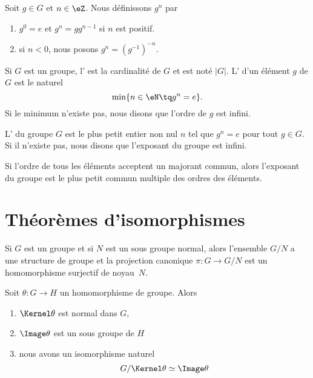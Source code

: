 \begin{definition}
    Soit \( g\in G\) et \( n\in \eZ\). Nous définissons \( g^n\) par
    \begin{enumerate}
        \item
            \( g^0=e\) et \( g^n=gg^{n-1}\) si \( n\) est positif.
        \item
            si \( n<0\), nous posons \( g^n=(g^{-1})^{-n}\).
    \end{enumerate}
\end{definition}

\begin{definition}
    Si \( G\) est un groupe, l' est la cardinalité de \( G\) et est noté \( | G |\). L' d'un élément \( g\) de \( G\) est le naturel
    \begin{equation}
        \min\{ n\in\eN\tq g^n=e \}.
    \end{equation}
    Si le minimum n'existe pas, nous disons que l'ordre de \( g\) est infini.
\end{definition}

\begin{definition}
    L' du groupe \( G\) est le plus petit entier non nul \( n\) tel que \( g^n=e\) pour tout \( g\in G\). Si il n'existe pas, nous disons que l'exposant du groupe est infini.
\end{definition}
Si l'ordre de tous les éléments acceptent un majorant commun, alors l'exposant du groupe est le plus petit commun multiple des ordres des éléments.

\section{Théorèmes d'isomorphismes}

Si \( G\) est un groupe et si \( N\) est un sous groupe normal, alors l'ensemble \( G/N\) a une structure de groupe et la projection canonique \( \pi\colon G\to G/N\) est un homomorphisme surjectif de noyau~\( N\).

\begin{theorem}        \label{ThoPremierthoisomo}
    Soit \( \theta\colon G\to H\) un homomorphisme de groupe. Alors
    \begin{enumerate}
        \item
            \( \Kernel\theta\) est normal dans \( G\),
        \item
            \( \Image \theta\) est un sous groupe de \( H\)
        \item
            nous avons un isomorphisme naturel
            \begin{equation}
                G/\Kernel\theta\simeq \Image\theta
            \end{equation}
    \end{enumerate}
\end{theorem}

